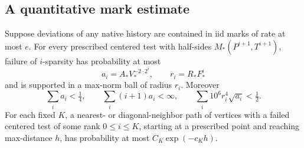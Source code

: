 \subsection{A quantitative mark estimate}
\begin{lemma}\label{lem:line-sparse}
Suppose deviations of any native history are contained in iid marks
of rate at most $e$. For every prescribed centered test with half-sides
$M_*(P^{i+1},T^{i+1})$, failure of $i$-sparsity has probability at most
\[
 a_i=A_*V_*^{-2\cdot2^i},\qquad r_i=R_*F_*^i
\]
and is supported in a max-norm ball of radius $r_i$.
Moreover
\[
 \sum_i a_i<\tfrac14,\qquad
 \sum_i(i+1)a_i<\infty,\qquad
 \sum_i10^6r_i^4\sqrt{a_i}<\tfrac12.
\]
For each fixed $K$, a nearest- or diagonal-neighbor path of vertices
with a failed centered test of some rank $0\le i\le K$, starting at
a prescribed point and reaching max-distance $h$, has probability
at most $C_K\exp(-c_Kh)$.
\end{lemma}
